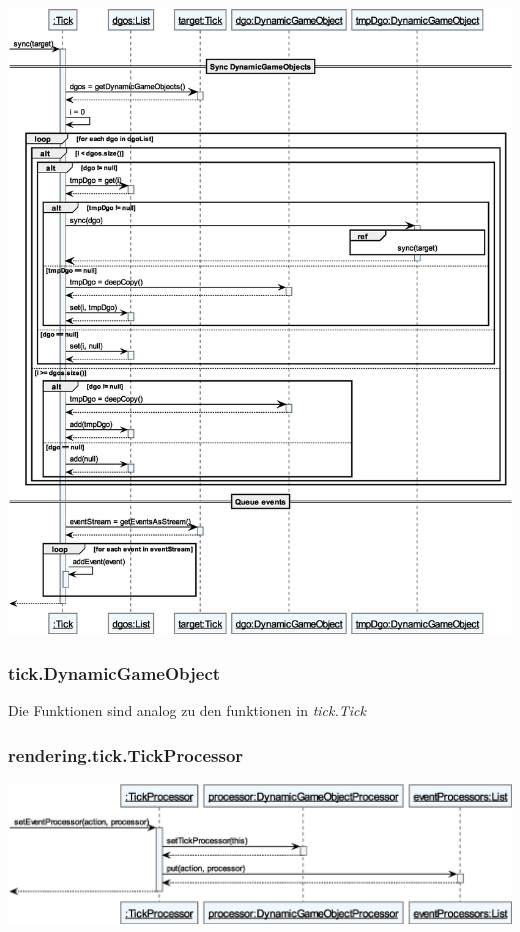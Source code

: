\begin{center}
    \includegraphics[width=\linewidth]{Interface/Tick_sync.eps}
\end{center}

\subsubsection{tick.DynamicGameObject}
Die Funktionen sind analog zu den funktionen in \textit{tick.Tick}

\subsubsection{rendering.tick.TickProcessor}

\begin{center}
    \includegraphics[width=\linewidth]{Interface/TickProcessor_setEventProcessor.eps}
\end{center}

